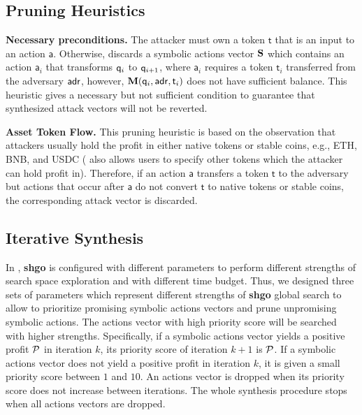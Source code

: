 \subsection{Pruning Heuristics}
\noindent \textbf{Necessary preconditions.} 
The attacker must own a token $\mathsf{t}$ that is an input to an action $\mathsf{a}$. 
Otherwise, {\synthesizer} discards a symbolic actions vector $\mathbf{S}$ which contains an action $\mathsf{a}_i$ that transforms $\mathsf{q}_i$ to $\mathsf{q}_{i+1}$, where $\mathsf{a}_i$ requires a token $\mathsf{t}_i$ transferred from the adversary $\mathsf{adr}$,  however, $\mathbf{M}(\mathsf{q}_i,\mathsf{adr},\mathsf{t}_i)$ does not have sufficient balance.
This heuristic gives a necessary but not sufficient condition to guarantee that synthesized attack vectors will not be reverted. 

\noindent \textbf{Asset Token Flow.} This pruning heuristic is based on the observation that attackers usually hold the profit in either native tokens or stable coins, e.g., ETH, BNB, and USDC ({\synthesizer} also allows users to specify other tokens which the attacker can hold profit in). Therefore, if an action $\mathsf{a}$ transfers a token $\mathsf{t}$ to the adversary but actions that occur after $\mathsf{a}$ do not convert $\mathsf{t}$ to native tokens or stable coins, the corresponding attack vector is discarded. 



\subsection{Iterative Synthesis}
In {\optimizer}, \textbf{shgo} is configured with different parameters to perform different strengths of search space exploration and with different time budget. Thus, we designed three sets of parameters which represent different strengths of \textbf{shgo} global search to allow {\synthesizer} to prioritize promising symbolic actions vectors and prune unpromising symbolic actions. The actions vector with high priority score will be searched with higher strengths. Specifically, if a symbolic actions vector yields a positive profit $\mathcal{P}$ in iteration $k$, its priority score of iteration $k+1$ is $\mathcal{P}$. If a symbolic actions vector does not yield a positive profit in iteration $k$, it is given a small priority score between $1$ and $10$. An actions vector is dropped when its priority score does not increase between iterations. The whole synthesis procedure stops when all actions vectors are dropped. 


